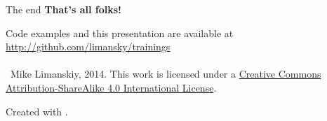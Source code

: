 \begin{frame}{The end}
\centering
\textbf{That's all folks!}

Code examples and this presentation are available at \url{http://github.com/limansky/trainings}\\~\\

\scriptsize{\ccbysa \ Mike Limanskiy, 2014.}
\vfill
\tiny
This work is licensed under a \href{http://creativecommons.org/licenses/by-sa/4.0/}{Creative Commons Attribution-ShareAlike 4.0 International License}.

Created with \LaTeXe.
\end{frame}

